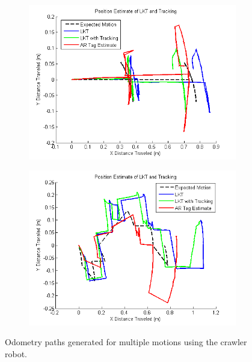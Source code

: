 \documentclass[letterpaper, 10 pt, conference]{ieeeconf}
\begin{document}
\begin{figure}[tb]
	\centering
	\begin{subfigure}{\columnwidth}
		  \centering
		  \includegraphics[width=\columnwidth]{crawler1_path.png}
		  \label{crawler:pattern1_path}
	\end{subfigure}
	\begin{subfigure}{\columnwidth}
		  \centering
		  \includegraphics[width=\columnwidth]{crawler2_path.png}
		  \label{crawler:pattern2_path}
	\end{subfigure}
	\caption{Odometry paths generated for multiple motions using the crawler robot.}
    \label{crawler_path}
\end{figure}
\end{document}
